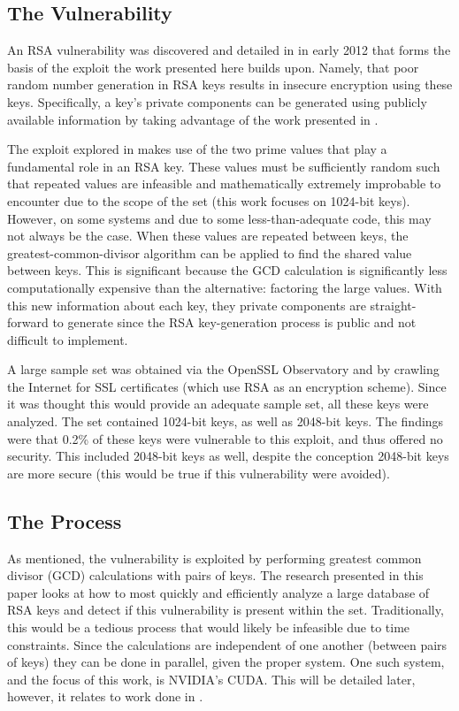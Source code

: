 \documentclass[smallextended]{svjour3}       %
\begin{document}
\subsection{The Vulnerability}
\label{subsec:vuln}
An RSA vulnerability was discovered and detailed in \cite{lenstra2012ron} in
early 2012 that forms the basis of the exploit the work presented here builds
upon. Namely, that poor random number generation in RSA keys results in
insecure encryption using these keys. Specifically, a key's private components
can be generated using publicly available information by taking advantage of
the work presented in \cite{scharfglass2012breaking}.

The exploit explored in \cite{lenstra2012ron} makes use of the two prime
values that play a fundamental role in an RSA key. These values must be
sufficiently random such that repeated values are infeasible and mathematically
extremely improbable to encounter due to the scope of the set (this work
focuses on 1024-bit keys). However, on some systems and due to some
less-than-adequate code, this may not always be the case. When these values are
repeated between keys, the greatest-common-divisor algorithm can be applied to
find the shared value between keys. This is significant because the GCD
calculation is significantly less computationally expensive than the
alternative: factoring the large values. With this new information about each key,
they private components are straight-forward to generate since the RSA
key-generation process is public and not difficult to implement.

A large sample set was obtained via the OpenSSL Observatory and by crawling the
Internet for SSL certificates (which use RSA as an encryption scheme). Since it
was thought this would provide an adequate sample set, all these keys were
analyzed. The set contained 1024-bit keys, as well as 2048-bit keys. The
findings were that 0.2\% of these keys were vulnerable to this exploit, and
thus offered no security. This included 2048-bit keys as well, despite the
conception 2048-bit keys are more secure (this would be true if this
vulnerability were avoided).

\subsection{The Process}
\label{subsec:process}
As mentioned, the vulnerability is exploited by performing greatest common
divisor (GCD) calculations with pairs of keys. The research presented in this
paper looks at how to most quickly and efficiently analyze a large database of
RSA keys and detect if this vulnerability is present within the set.
Traditionally, this would be a tedious process that would likely be infeasible
due to time constraints. Since the calculations are independent of one another
(between pairs of keys) they can be done in parallel, given the proper system.
One such system, and the focus of this work, is NVIDIA's CUDA. This will be
detailed later, however, it relates to work done in \cite{fujimoto2009high}. 
\end{document}
